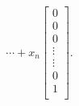 \begin{equation*}
                        \cdots
                        +
                        x_{n}\left[
                            \begin{array}{c}
                                0 \\
                                0 \\
                                0 \\
                                \vdots \\
                                \vdots \\
                                0 \\
                                1 \\
                            \end{array}
                        \right]
                        .
                    \end{equation*}

